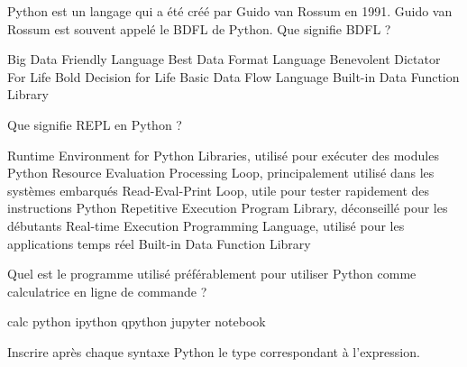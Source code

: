 \documentclass[french,a4paper,addpoints,11pt]{exam}
\begin{document}
\begin{questions}


    \question

    Python est un langage qui a été créé par Guido van Rossum en 1991. Guido van Rossum est souvent appelé le BDFL de Python. Que signifie BDFL ?

    \begin{multicols}{2}
        \begin{checkboxes}
            \choice Big Data Friendly Language
            \choice Best Data Format Language
            \CorrectChoice Benevolent Dictator For Life
            \choice Bold Decision for Life
            \choice Basic Data Flow Language
            \choice Built-in Data Function Library
        \end{checkboxes}
    \end{multicols}

    \question

    Que signifie REPL en Python ?

    \begin{checkboxes}
        \choice Runtime Environment for Python Libraries, utilisé pour exécuter des modules Python
        \choice Resource Evaluation Processing Loop, principalement utilisé dans les systèmes embarqués
        \CorrectChoice Read-Eval-Print Loop, utile pour tester rapidement des instructions Python
        \choice Repetitive Execution Program Library, déconseillé pour les débutants
        \choice Real-time Execution Programming Language, utilisé pour les applications temps réel
        \choice Built-in Data Function Library
    \end{checkboxes}

    \question

    Quel est le programme utilisé préférablement pour utiliser Python comme calculatrice en ligne de commande ?

    \begin{multicols}{3}
        \begin{checkboxes}
            \choice calc
            \choice python
            \CorrectChoice ipython
            \choice qpython
            \choice jupyter
            \choice notebook
        \end{checkboxes}
    \end{multicols}

    \question

    Inscrire après chaque syntaxe Python le type correspondant à l'expression.


\end{questions}
\end{document}
